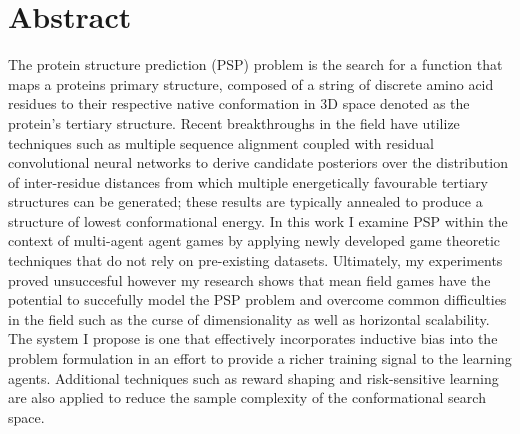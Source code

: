 
\chapter*{Abstract}

The protein structure prediction (PSP) problem  is the search for a 
function that maps a proteins primary structure, 
composed of a string of discrete amino acid residues to 
their respective native conformation in 
3D space denoted as the protein's tertiary structure. 
Recent breakthroughs in the field have utilize 
techniques such as multiple sequence alignment 
coupled with residual convolutional neural networks 
to derive candidate posteriors over the distribution 
of inter-residue distances from which multiple 
energetically favourable tertiary structures can be 
generated; these results are typically annealed to produce 
a structure of lowest conformational energy. In this work 
I examine PSP within the context of multi-agent agent games
by applying newly developed game theoretic techniques 
that do not rely on pre-existing datasets.
Ultimately, my experiments proved unsuccesful however
my research shows that mean field games have the potential
to succefully model the PSP problem and overcome common
difficulties in the field such as the curse of dimensionality
as well as horizontal scalability. The system
I propose is one that effectively incorporates inductive bias 
into the problem formulation in an effort to provide
a richer training signal to the learning agents. 
Additional techniques such as 
reward shaping and risk-sensitive learning are also
applied to reduce the sample complexity of the
conformational search space.
